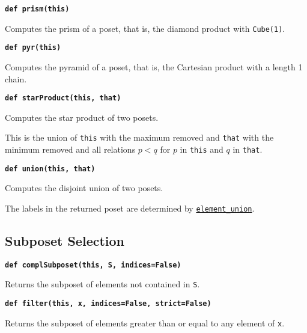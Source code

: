 \documentclass[12pt]{article}
\begin{document}
\begin{child}
{{}\endlist}

\textbf{\hypertarget{Poset.prism}{\texttt{def prism(this)}}}
{\list{}{\leftmargin 0.5cm}\item{
Computes the prism of a poset, that is, the diamond product with \verb|Cube(1)|.


}\endlist}

\textbf{\hypertarget{Poset.pyr}{\texttt{def pyr(this)}}}
{\list{}{\leftmargin 0.5cm}\item{
Computes the pyramid of a poset, that is, the Cartesian product with a length 1 chain.


}\endlist}

\textbf{\hypertarget{Poset.starProduct}{\texttt{def starProduct(this, that)}}}
{\list{}{\leftmargin 0.5cm}\item{
Computes the star product of two posets.

This is the union of \verb|this| with the maximum removed and \verb|that| with the minimum
removed and all relations $p<q$ for $p$ in \verb|this| and $q$ in \verb|that|.


}\endlist}

\textbf{\hypertarget{Poset.union}{\texttt{def union(this, that)}}}
{\list{}{\leftmargin 0.5cm}\item{
Computes the disjoint union of two posets.

The labels in the returned poset are determined
by \hyperlink{Poset.element_union}{\texttt{element\_union}}.


}\endlist}

\subsection{Subposet Selection}
\label{Subposet Selection}

\textbf{\hypertarget{Poset.complSubposet}{\texttt{def complSubposet(this, S, indices=False)}}}
{\list{}{\leftmargin 0.5cm}\item{
Returns the subposet of elements not contained in \verb|S|.


}\endlist}

\textbf{\hypertarget{Poset.filter}{\texttt{def filter(this, x, indices=False, strict=False)}}}
{\list{}{\leftmargin 0.5cm}\item{
Returns the subposet of elements greater than or equal to any element of \verb|x|.

}}
\end{child}
\end{document}
